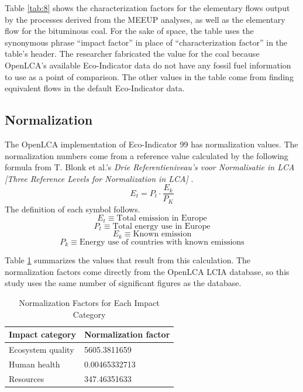 \documentclass[final,journal,10pt,letterpaper,oneside,twocolumn,compsoc]%
{IEEEtran}
\begin{document}
Table \ref{tab:8} shows the characterization factors for the elementary flows
output by the
processes derived from the MEEUP analyses, as well as the elementary flow for
the bituminous coal. For the sake of space, the table uses
the synonymous phrase ``impact factor'' in place of ``characterization factor''
in the table's header. The
researcher fabricated the value for the coal because OpenLCA's
available Eco-Indicator data do
not have any fossil fuel information to use as a point of comparison. The other
values in
the table come from finding equivalent flows in the default Eco-Indicator data.

\subsection{Normalization}
The OpenLCA implementation of Eco-Indicator 99 has
normalization values. The normalization numbers come from a reference value
calculated by the following formula from T. Blonk et al.'s \textit{Drie
Referentieniveau's voor Normalisatie in LCA [Three Reference Levels for
Normalization in LCA]} \cite{blonk} \cite{pre-annex}. 
\begin{equation}
  E_t = P_t \cdot \frac{E_k}{P_K}
\end{equation}
The definition of each symbol follows.
\begin{equation}
  E_t \equiv \textrm{Total emission in Europe}
\end{equation}
\begin{equation}
  P_t \equiv \textrm{Total energy use in Europe}
\end{equation}
\begin{equation}
  E_k \equiv \textrm{Known emission}
\end{equation}
\begin{equation}
  P_k \equiv \textrm{Energy use of countries with known emissions}
\end{equation}

Table \ref{tab:9} summarizes the values that result from this calculation. The
normalization factors come directly from the OpenLCA LCIA database, so this
study uses the same number of significant figures as the database.

\begin{table}[t!]
  \caption{Normalization Factors for Each Impact Category}
  \label{tab:9}
  \centering
    \begin{tabular}{| l | l |}
      \hline
      Impact category   & Normalization factor \\
      \hline
      Ecosystem quality & 5605.3811659 \\
      Human health      & 0.00465332713 \\
      Resources         & 347.46351633 \\
      \hline
    \end{tabular}
\end{table}
\end{document}
